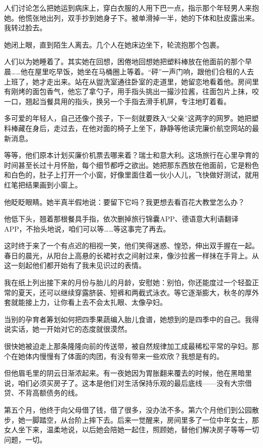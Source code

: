 \documentclass[lang=cn,newtx,12pt,scheme=chinese]{elegantbook}
\begin{document}
人们讨论怎么把她运到病床上，穿白衣服的人用下巴一点，指示那个年轻男人来抱她。他慌张地出列，双手抄到她身子下。被单滑掉一半，她的下体和肚皮露出来。我转过脸去。

她闭上眼，直到陌生人离去。几个人在她床边坐下，轮流抱那个包裹。

人们以为她睡着了。其实她在回想，困倦地回想她把塑料棒放在他面前的那个早晨……他在屋里吃早饭，她坐在马桶圈上等着。“砰”一声门响，跟他们合租的人去上班了，她才走出来。站在从盥洗室通往卧室的走道里，她留恋地看着他。房间里有刚烤的面包香气，他忘了拿勺子，用手指头挑出一撮沙拉酱，往面包片上抹，咬一口，翘起当餐具用的指头，换另一个手指去滑手机屏，专注地盯着看。

多可爱的年轻人，自己还像个孩子，下一刻就要跌入“父亲”这两字的网罗。她把塑料棒藏在身后，走过去，在他对面的椅子上坐下，静静等他读完廉价航空网站的最新消息。

等等，他们原本计划买廉价机票去哪来着？瑞士和意大利。这场旅行在心里孕育的时间甚至长过十月怀胎，每个细节都呼之欲出。她把那东西放在他面前，它是粉色和白色的，肚子上打开一个小窗，好像里面住着一伙小人儿，飞快做好测试，就用红笔把结果画到小窗上。

他眨眨眼睛。她半真半假地说：要留下它吗？我更想去看百花大教堂怎么办？

他低下头，翘着那根餐具手指，依次删掉旅行锦囊APP、德语意大利语翻译APP，不抬头地说，咱们可以等……等这事完了再去。

这时终于来了一个有点迟的相视一笑，他们笑得迷惑、惶恐，伸出双手握在一起。春日的晨光，从阳台上高悬的长裙衬衣之间射过来，像沙拉酱一样抹在手背上。从这一刻起他们都开始有了我未见识过的表情。

我在纸上列出接下来的月份与胎儿的月龄，安慰她：别怕，你还能度过一个轻盈正常的夏天，还可以继续穿露脐装、短裤和两截式泳衣。等它逐渐膨大，秋冬的厚外套就能接上力，让你看上去不会太扎眼、太像孕妇。

当别的孕育者筹划如何把四季果蔬编入胎儿食谱，她想到的是四季中的自己。我得说实话，她一开始对它的态度就很漠然。

很快她被迫走上那条隆隆向前的传送带，被自然规律加工成最稀松平常的孕妇。那个在她体内慢慢有了体面的肉团，有没有带来一些欢欣？我想是有的。

但他眉毛里的阴云日渐浓起来。有一夜她因为胃胀翻来覆去的时候，他在黑暗里说，咱们必须买房子了。这本是他们对生活保持乐观的最后底线——没有大宗借贷、不背高额债务的线。

第五个月，他终于向父母借了钱，借了很多，没办法不多。第六个月他们到公园散步，她一脚踏空，从台阶上摔下去。后来一觉醒来，房间里多了一位中年女士，那女人坐下来，温柔地说，以后她会陪她一起住，照顾她，替他们解决房子等等一切问题，一切。
\end{document}
